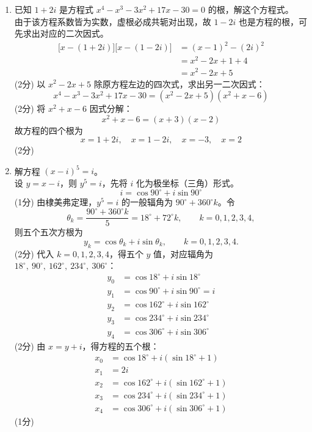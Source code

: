 \documentclass[12pt,a4paper]{exam-zh}
\newcommand{\solutionlayout}{%
    \setlength{\abovedisplayskip}{0.6em}%
    \setlength{\belowdisplayskip}{0.6em}%
    \setlength{\abovedisplayshortskip}{0.35em}%
    \setlength{\belowdisplayshortskip}{0.35em}%
    \setlength{\jot}{0.35em}%
}
\begin{document}
\begin{solution}
    \solutionlayout
    \begin{enumerate}[label=(\alph*),leftmargin=2.4em,itemsep=1em,topsep=0.5em,parsep=0.25em]
        \item 已知 $1+2i$ 是方程式 $x^4-x^3-3x^2+17x-30=0$ 的根，解这个方程式。 \\
        由于该方程系数皆为实数，虚根必成共轭对出现，故 $1-2i$ 也是方程的根，可先求出对应的二次因式。
        \begin{align*}
            \big[x-(1+2i)\big]\big[x-(1-2i)\big] &= (x-1)^2-(2i)^2 \\
            &= x^2-2x+1+4 \\
            &= x^2-2x+5
        \end{align*}
        \hfill (2分)
        以 $x^2-2x+5$ 除原方程左边的四次式，求出另一二次因式：
        \[
            x^4-x^3-3x^2+17x-30 = (x^2-2x+5)(x^2+x-6)
        \]
        \hfill (2分)
        将 $x^2+x-6$ 因式分解：
        \[
            x^2+x-6=(x+3)(x-2)
        \]
        故方程的四个根为
        \[
            x=1+2i,\quad x=1-2i,\quad x=-3,\quad x=2
        \]
        \hfill (2分)

        \item 解方程 $(x-i)^5=i$。 \\
        设 $y=x-i$，则 $y^5=i$，先将 $i$ 化为极坐标（三角）形式。
        \[
            i=\cos90^\circ+i\sin90^\circ
        \]
        \hfill (1分)
        由棣美弗定理，$y^5=i$ 的一般辐角为 $90^\circ+360^\circ k$。令
        \[
            \theta_k=\frac{90^\circ+360^\circ k}{5}
            =18^\circ+72^\circ k,
            \qquad k=0,1,2,3,4,
        \]
        则五个五次方根为
        \[
            y_k=\cos\theta_k+i\sin\theta_k,
            \qquad k=0,1,2,3,4.
        \]
        \hfill (2分)
        代入 $k=0,1,2,3,4$，得五个 $y$ 值，对应辐角为 $18^\circ,\ 90^\circ,\ 162^\circ,\ 234^\circ,\ 306^\circ$：
        \begin{align*}
            y_0 &= \cos18^\circ+i\sin18^\circ \\
            y_1 &= \cos90^\circ+i\sin90^\circ = i \\
            y_2 &= \cos162^\circ+i\sin162^\circ \\
            y_3 &= \cos234^\circ+i\sin234^\circ \\
            y_4 &= \cos306^\circ+i\sin306^\circ
        \end{align*}
        \hfill (2分)
        由 $x=y+i$，得方程的五个根：
        \begin{align*}
            x_0 &= \cos18^\circ+i(\sin18^\circ+1) \\
            x_1 &= 2i \\
            x_2 &= \cos162^\circ+i(\sin162^\circ+1) \\
            x_3 &= \cos234^\circ+i(\sin234^\circ+1) \\
            x_4 &= \cos306^\circ+i(\sin306^\circ+1)
        \end{align*}
        \hfill (1分)
    \end{enumerate}
\end{solution}
\end{document}
